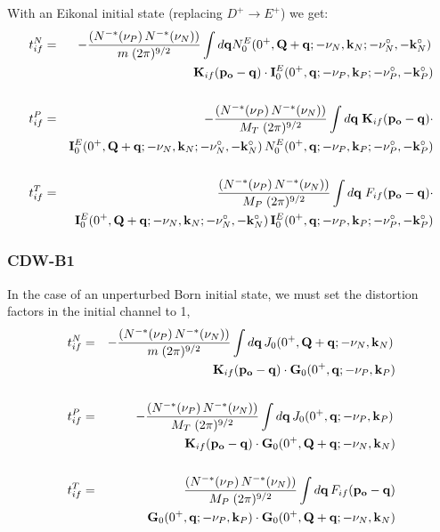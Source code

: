 With an Eikonal initial state (replacing $D^{+} \to E^{+}$) we get:
\begin{eqnarray}\label{Q:tn_if-cdw-eis}
t^{N}_{if}&=& -\frac{\left(N^{-*}(\nu_{P}) \,N^{-*}(\nu_{N}) \right)}{m
\; (2 \pi)^{9/2}} \int d \mathbf{q} N^{E}_{0}(0^{+}, \mathbf{Q} + \mathbf{q};
-\nu_{N}, \mathbf{k}_{N}; -\nu_{N}^{\circ}, -\mathbf{k}_{N}^{\circ} ) \,
  \\
&& \mathbf{K}_{if}(\mathbf{p_{o}}- \mathbf{q}) \cdot \mathbf{I}^{E}_{0}( 0^{+} , \mathbf{q}
; -\nu_{P}, \mathbf{k}_{P} ; -\nu_{P}^{\circ}, -\mathbf{k}_{P}^{\circ}) \nonumber
  \\
\nonumber \\
t^{P}_{if} &=& -\frac{\left(N^{-*}(\nu_{P}) \,N^{-*}(\nu_{N})
\right)}{M_{T} \; (2 \pi)^{9/2}} \int d \mathbf{q} \;
\mathbf{K}_{if}(\mathbf{p_{o}}- \mathbf{q}) \cdot
  \\
&& \mathbf{I}^{E}_{0}(0^{+}, \mathbf{Q} + \mathbf{q}; -\nu_{N}, \mathbf{k}_{N};
-\nu_{N}^{\circ}, -\mathbf{k}_{N}^{\circ} ) \,  N^{E}_{0}( 0^{+} ,
\mathbf{q};-\nu_{P},\mathbf{k}_{P}; -\nu_{P}^{\circ}, -\mathbf{k}_{P}^{\circ}) \nonumber
\\
\nonumber \\
t^{T}_{if}&=& \frac{\left(N^{-*}(\nu_{P}) \,N^{-*}(\nu_{N})
\right)}{M_{P} \; (2 \pi)^{9/2}} \int d \mathbf{q} \; F_{if}(\mathbf{p_{o}}-
\mathbf{q}) \cdot
  \\
&& \mathbf{I}^{E}_{0}(0^{+}, \mathbf{Q} + \mathbf{q}; -\nu_{N}, \mathbf{k}_{N};
-\nu_{N}^{\circ}, -\mathbf{k}_{N}^{\circ} ) \,  \mathbf{I}^{E}_{0}( 0^{+} ,
\mathbf{q};-\nu_{P},\mathbf{k}_{P}; -\nu_{P}^{\circ}, -\mathbf{k}_{P}^{\circ}) \nonumber
\end{eqnarray}

\subsubsection{CDW-B1}

In the case of an unperturbed Born initial state, we must set the
distortion factors in the initial channel to 1,
\begin{eqnarray}\label{Q:tn_if-cdw-b1}
t^{N}_{if}&=& -\frac{\left(N^{-*}(\nu_{P}) \,N^{-*}(\nu_{N}) \right)}{m
\; (2 \pi)^{9/2}} \int d \mathbf{q} \, J_{0}(0^{+}, \mathbf{Q} + \mathbf{q};
-\nu_{N}, \mathbf{k}_{N} ) \,
  \\
&& \mathbf{K}_{if}(\mathbf{p_{o}}- \mathbf{q}) \cdot \mathbf{G}_{0}( 0^{+} ,
\mathbf{q};-\nu_{P},\mathbf{k}_{P}) \nonumber
  \\
\nonumber \\
t^{P}_{if}&=& -\frac{\left(N^{-*}(\nu_{P}) \,N^{-*}(\nu_{N})
\right)}{M_{T} \; (2 \pi)^{9/2}} \int d \mathbf{q} \, J_{0}( 0^{+} ,
\mathbf{q};-\nu_{P},\mathbf{k}_{P})  \,
  \\
&& \mathbf{K}_{if}(\mathbf{p_{o}}- \mathbf{q}) \cdot \mathbf{G}_{0}(0^{+}, \mathbf{Q} +
\mathbf{q}; -\nu_{N}, \mathbf{k}_{N} )\nonumber
  \\
\nonumber \\
t^{T}_{if}&=& \frac{\left(N^{-*}(\nu_{P}) \,N^{-*}(\nu_{N})
\right)}{M_{P} \; (2 \pi)^{9/2}} \int d \mathbf{q} \, F_{if}(\mathbf{p_{o}}-
\mathbf{q})
  \\
&&  \mathbf{G}_{0}( 0^{+} , \mathbf{q};-\nu_{P},\mathbf{k}_{P})\cdot
\mathbf{G}_{0}(0^{+}, \mathbf{Q} + \mathbf{q}; -\nu_{N}, \mathbf{k}_{N} )\nonumber
\end{eqnarray}

